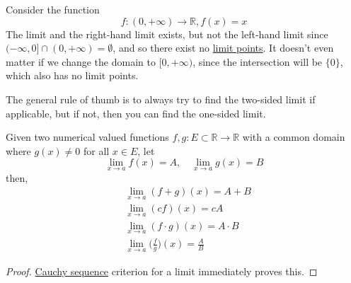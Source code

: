   \begin{example}
    \label{ex:limit-and-right-hand-limit-exists-but-not-left}
    Consider the function 
    \begin{equation}
      f: (0, +\infty) \to \mathbb{R}, f(x) = x
    \end{equation}
    The limit and the right-hand limit exists, but not the left-hand limit since $(-\infty, 0] \cap (0, +\infty) = \emptyset$, and so there exist no \hyperref[pst-def:limit-point]{limit points}. It doesn't even matter if we change the domain to $[0, +\infty)$, since the intersection will be $\{0\}$, which also has no limit points. 

    \begin{figure}[H]
      \centering
      \caption{}
      \label{fig:relu_graph}
    \end{figure}
  \end{example}

  The general rule of thumb is to always try to find the two-sided limit if applicable, but if not, then you can find the one-sided limit. 

  \begin{theorem}
    \label{thm:arithmetic-on-limits-of-functions}
    Given two numerical valued functions $f, g: E \subset \mathbb{R} \to \mathbb{R}$ with a common domain where $g(x) \neq 0$ for all $x \in E$, let 
    \begin{equation}
      \lim_{x \to a} f(x) = A, \quad \lim_{x \to a} g(x) = B
    \end{equation}
    then, 
    \begin{align*}
      & \lim_{x \to a} (f+g)(x) = A + B \\
      & \lim_{x \to a} (cf)(x) = cA \\
      & \lim_{x \to a} (f \cdot g)(x) = A \cdot B \\
      & \lim_{x \to a} \bigg(\frac{f}{g}\bigg) (x) = \frac{A}{B}
    \end{align*}
  \end{theorem}
  \begin{proof}
    \hyperref[def:cauchy-sequence]{Cauchy sequence} criterion for a limit immediately proves this. 
  \end{proof}

